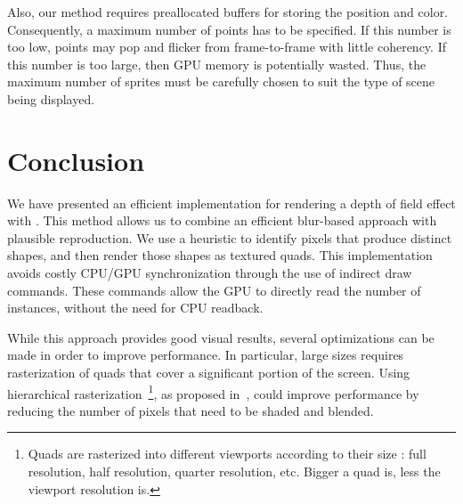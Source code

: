 Also, our method requires preallocated buffers for storing the \bokeh position and color. Consequently, a maximum number of \bokeh points has to be specified. If this number is too low, \bokeh points may pop and flicker from frame-to-frame with little coherency. If this number is too large, then GPU memory is potentially wasted. Thus, the maximum number of sprites must be carefully chosen to suit the type of scene being displayed.

\section{Conclusion}
We have presented an efficient implementation for rendering a depth of field effect with \bokeh. This method allows us to combine an efficient blur-based approach with plausible \bokeh reproduction. We use a heuristic to identify pixels that produce distinct \bokeh shapes, and then render those shapes as textured quads. This implementation avoids costly CPU/GPU synchronization through the use of indirect draw commands. These commands allow the GPU to directly read the number of instances, without the need for CPU readback.

While this approach provides good visual results, several optimizations can be made in order to improve performance. In particular, large \coc sizes requires rasterization of quads that cover a significant portion of the screen. Using hierarchical rasterization~\footnote{Quads are rasterized into different viewports according to their size :  full resolution, half resolution, quarter resolution, etc. Bigger a quad is, less the viewport resolution is.}, as proposed in~\cite{Futurmark11}, could improve performance by reducing the number of pixels that need to be shaded and blended.



